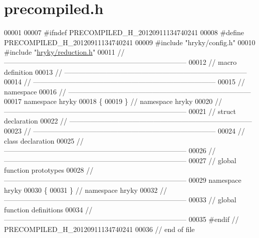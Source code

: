 \hypertarget{reduction_2src_2precompiled_8h_source}{\section{precompiled.\-h}
}

\begin{DoxyCode}
00001 
00007 \textcolor{preprocessor}{#ifndef PRECOMPILED\_H\_20120911134740241}
00008 \textcolor{preprocessor}{}\textcolor{preprocessor}{#define PRECOMPILED\_H\_20120911134740241}
00009 \textcolor{preprocessor}{}\textcolor{preprocessor}{#include "hryky/config.h"}
00010 \textcolor{preprocessor}{#include "\hyperlink{reduction_8h}{hryky/reduction.h}"}
00011 \textcolor{comment}{//
      ------------------------------------------------------------------------------}
00012 \textcolor{comment}{// macro definition}
00013 \textcolor{comment}{//
      ------------------------------------------------------------------------------}
00014 \textcolor{comment}{//
      ------------------------------------------------------------------------------}
00015 \textcolor{comment}{// namespace}
00016 \textcolor{comment}{//
      ------------------------------------------------------------------------------}
00017 \textcolor{keyword}{namespace }hryky
00018 \{
00019 \} \textcolor{comment}{// namespace hryky}
00020 \textcolor{comment}{//
      ------------------------------------------------------------------------------}
00021 \textcolor{comment}{// struct declaration}
00022 \textcolor{comment}{//
      ------------------------------------------------------------------------------}
00023 \textcolor{comment}{//
      ------------------------------------------------------------------------------}
00024 \textcolor{comment}{// class declaration}
00025 \textcolor{comment}{//
      ------------------------------------------------------------------------------}
00026 \textcolor{comment}{//
      ------------------------------------------------------------------------------}
00027 \textcolor{comment}{// global function prototypes}
00028 \textcolor{comment}{//
      ------------------------------------------------------------------------------}
00029 \textcolor{keyword}{namespace }hryky
00030 \{
00031 \} \textcolor{comment}{// namespace hryky}
00032 \textcolor{comment}{//
      ------------------------------------------------------------------------------}
00033 \textcolor{comment}{// global function definitions}
00034 \textcolor{comment}{//
      ------------------------------------------------------------------------------}
00035 \textcolor{preprocessor}{#endif // PRECOMPILED\_H\_20120911134740241}
00036 \textcolor{preprocessor}{}\textcolor{comment}{// end of file}
\end{DoxyCode}
